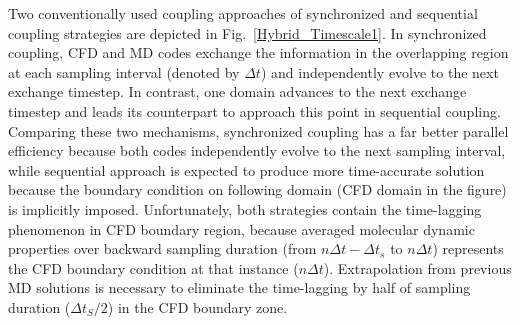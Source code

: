 \documentclass[preprint,12pt]{elsarticle}
\begin{document}
Two conventionally used coupling approaches of synchronized and sequential coupling strategies are depicted in Fig.~\ref{Hybrid_Timescale1}. In synchronized coupling, CFD and MD codes exchange the information in the overlapping region at each sampling interval (denoted by ${\Delta}t$) and independently evolve to the next exchange timestep. In contrast, one domain advances to the next exchange timestep and leads its counterpart to approach this point in sequential coupling. Comparing these two mechanisms, synchronized coupling has a far better parallel efficiency because both codes independently evolve to the next sampling interval, while sequential approach is expected to produce more time-accurate solution because the boundary condition on following domain (CFD domain in the figure) is implicitly imposed. Unfortunately, both strategies contain the time-lagging phenomenon in CFD boundary region, because averaged molecular dynamic properties over backward sampling duration (from $n{\Delta}t-{\Delta}t_{s}$ to $n{\Delta}t$) represents the CFD boundary condition at that instance ($n{\Delta}t$). Extrapolation from previous MD solutions is necessary to eliminate the time-lagging by half of sampling duration (${\Delta}t_{S}/{2}$) in the CFD boundary zone.
\end{document}
